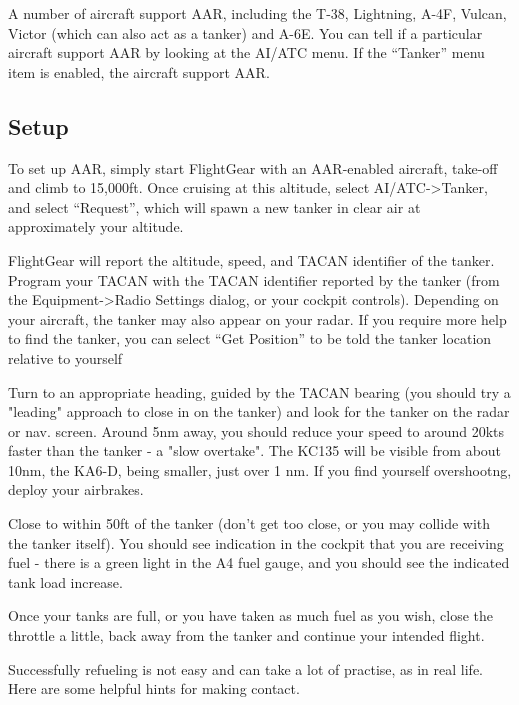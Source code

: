 A number of aircraft support AAR, including the T-38, Lightning, A-4F, Vulcan,
Victor (which can also act as a tanker) and A-6E. You can tell if a particular
aircraft support AAR by looking at the AI/ATC menu. If the ``Tanker'' menu item
is enabled, the aircraft support AAR.

\subsection{Setup}

To set up AAR, simply start FlightGear with an AAR-enabled aircraft, take-off
and climb to 15,000ft. Once cruising at this altitude, select AI/ATC->Tanker,
and select ``Request'', which will spawn a new tanker in clear air at
approximately your altitude.

FlightGear will report the altitude, speed, and TACAN identifier of the tanker.
Program your TACAN with the TACAN identifier reported by the tanker (from the
Equipment->Radio Settings dialog, or your cockpit controls). Depending on your
aircraft, the tanker may also appear on your radar. If you require more help to
find the tanker, you can select ``Get Position'' to be told the tanker
location relative to yourself

Turn to an appropriate heading, guided by the TACAN bearing (you should
try a "leading" approach to close in on the tanker) and look for the
tanker on the radar or nav. screen.  Around 5nm away, you should reduce
your speed to around 20kts faster than the tanker - a "slow overtake".  The
KC135 will be visible from about 10nm, the KA6-D, being smaller, just over 1 nm.
If you find yourself overshootng, deploy your airbrakes.

Close to within 50ft of the tanker (don't get too close, or you may collide with
the tanker itself).  You should see indication in
the cockpit that you are receiving fuel - there is a green light in the
A4 fuel gauge, and you should see the indicated tank load increase.

Once your tanks are full, or you have taken as much fuel as you wish,
close the throttle a little, back away from the tanker and continue
your intended flight.

Successfully refueling is not easy and can take a lot of practise, as in real
life. Here are some helpful hints for making contact.

